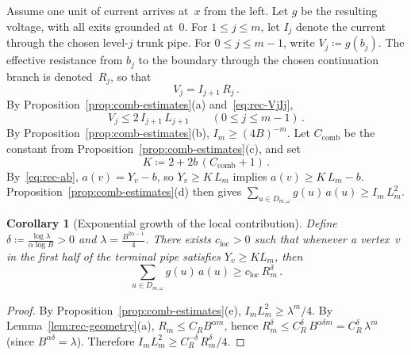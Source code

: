 \documentclass[aop]{imsart}
\theoremstyle{plain}
\newtheorem{corollary}[theorem]{Corollary}
\theoremstyle{definition}
\begin{document}
	Assume one unit of current arrives at~$x$ from the left.  Let $g$ be the resulting voltage, with all exits grounded at~$0$.  For $1\leq j\leq m$, let $I_j$ denote the current through the chosen level-$j$ trunk pipe.  For $0\leq j\leq m{-}1$, write $V_j\coloneqq g(b_j)$.  The effective resistance from $b_j$ to the boundary through the chosen continuation branch is denoted~$R_j$, so that
	\begin{equation}\label{eq:rec-VjIj}
		V_j=I_{j+1}\,R_j\,.
	\end{equation}
	By Proposition~\ref{prop:comb-estimates}(a) and~\eqref{eq:rec-VjIj},
	\begin{equation}
		V_j\leq 2\,I_{j+1}\,L_{j+1}
		\qquad(0\leq j\leq m{-}1)\,.
	\end{equation}
	By Proposition~\ref{prop:comb-estimates}(b), $I_m\geq(4B)^{-m}$.  Let $C_{\mathrm{comb}}$ be the constant from Proposition~\ref{prop:comb-estimates}(c), and set
	\begin{equation}\label{eq:rec-K}
		K\coloneqq2+2b\,(C_{\mathrm{comb}}+1)\,.
	\end{equation}
	By~\eqref{eq:rec-ab}, $a(v)=Y_v-b$, so $Y_v\geq K\,L_m$ implies $a(v)\geq K\,L_m-b$. Proposition~\ref{prop:comb-estimates}(d) then gives $\sum_{u\in D_{m,\omega}}g(u)\,a(u)\geq I_m\,L_m^2$.
	
	\begin{corollary}[Exponential growth of the local contribution]\label{cor:rec-loc}
		Define $\delta\coloneqq\frac{\log\lambda}{\alpha\log B}>0$ and $\lambda=\frac{B^{2\alpha-1}}{4}$. There exists $c_{\mathrm{loc}}>0$ such that whenever a vertex~$v$ in the first half of the terminal pipe satisfies $Y_v\geq KL_m$, then
		\[
		\sum_{u\in D_{m,\omega}}
		g(u)\,a(u)
		\geq c_{\mathrm{loc}}\,R_m^{\delta}\,.
		\]
	\end{corollary}
	
	\begin{proof}
		By Proposition~\ref{prop:comb-estimates}(e), $I_m L_m^2\geq\lambda^m/4$.  By Lemma~\ref{lem:rec-geometry}(a), $R_m\leq C_R B^{\alpha m}$, hence $R_m^{\delta}\leq C_R^{\delta}\,B^{\alpha\delta m} =C_R^{\delta}\,\lambda^m$ (since $B^{\alpha\delta}=\lambda$).  Therefore $I_m L_m^2\geq C_R^{-\delta}\,R_m^{\delta}/4$.
	\end{proof}
	
\end{document}
